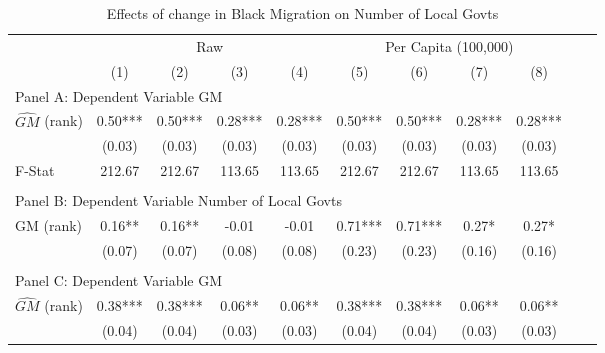  \begin{table}[htbp]\centering {} \begin{threeparttable} \caption{Effects of change in Black Migration on Number of Local Govts} \begin{tabular}{l*{10}{c}} \toprule
                &\multicolumn{4}{c}{Raw}                                    &\multicolumn{4}{c}{Per Capita (100,000)}                   \\\cmidrule(lr){2-5}\cmidrule(lr){6-9}
                &\multicolumn{1}{c}{(1)}   &\multicolumn{1}{c}{(2)}   &\multicolumn{1}{c}{(3)}   &\multicolumn{1}{c}{(4)}   &\multicolumn{1}{c}{(5)}   &\multicolumn{1}{c}{(6)}   &\multicolumn{1}{c}{(7)}   &\multicolumn{1}{c}{(8)}   \\
\cmidrule(lr){1-9}
\multicolumn{8}{l}{Panel A: Dependent Variable GM}\\
\cmidrule(lr){1-9}
$\hat{GM}$ (rank)&       0.50***&       0.50***&       0.28***&       0.28***&       0.50***&       0.50***&       0.28***&       0.28***\\
                &     (0.03)   &     (0.03)   &     (0.03)   &     (0.03)   &     (0.03)   &     (0.03)   &     (0.03)   &     (0.03)   \\
\midrule
F-Stat          &     212.67   &     212.67   &     113.65   &     113.65   &     212.67   &     212.67   &     113.65   &     113.65   \\
\cmidrule[\heavyrulewidth](lr){1-9} \\ \cmidrule[\heavyrulewidth](lr){1-9}
\multicolumn{8}{l}{Panel B: Dependent Variable Number of Local Govts}\\
\cmidrule(lr){1-9}
GM  (rank)      &       0.16** &       0.16** &      -0.01   &      -0.01   &       0.71***&       0.71***&       0.27*  &       0.27*  \\
                &     (0.07)   &     (0.07)   &     (0.08)   &     (0.08)   &     (0.23)   &     (0.23)   &     (0.16)   &     (0.16)   \\
\cmidrule[\heavyrulewidth](lr){1-9} \\ \cmidrule[\heavyrulewidth](lr){1-9}
\multicolumn{8}{l}{Panel C: Dependent Variable GM}\\
\cmidrule(lr){1-9}
$\hat{GM}$ (rank)&       0.38***&       0.38***&       0.06** &       0.06** &       0.38***&       0.38***&       0.06** &       0.06** \\
                &     (0.04)   &     (0.04)   &     (0.03)   &     (0.03)   &     (0.04)   &     (0.04)   &     (0.03)   &     (0.03)   \\

\end{tabular}
\end{threeparttable}
\end{table}
